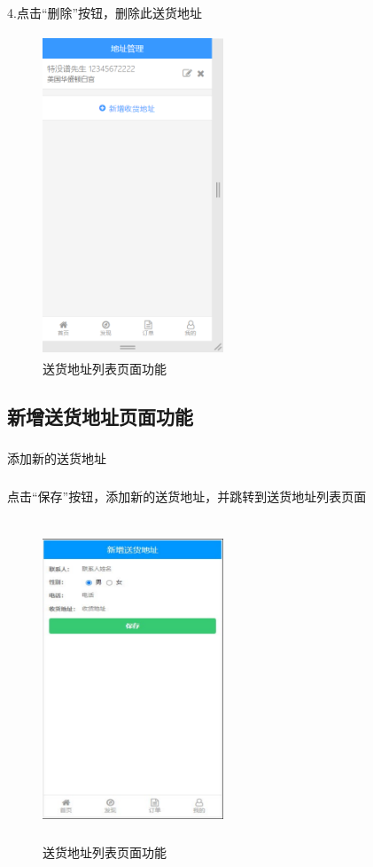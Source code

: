 4.点击“删除”按钮，删除此送货地址
\begin{figure}[H]
    \centering
    \includegraphics[width=5.4cm,height=9.6cm]{figures/3.1.6.png}
    \caption{送货地址列表页面功能}
\end{figure}

\subsection{新增送货地址页面功能}
\subsubsection*{}
添加新的送货地址
\subsubsection*{}
点击“保存”按钮，添加新的送货地址，并跳转到送货地址列表页面
\begin{figure}[H]
    \centering
    \includegraphics[width=5.4cm,height=9.6cm]{figures/3.1.7.png}
    \caption{送货地址列表页面功能}
\end{figure}

